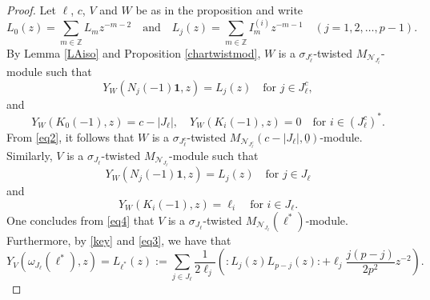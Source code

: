 \documentclass[12pt, reqno]{amsart}
\numberwithin{equation}{section}
\numberwithin{equation}{section}
\def\({\left(}
\def\){\right)}
\newcommand{\Z}{\mathbb{Z}}
\newcommand{\CN}{\mathcal{N}}
\newcommand{\un}[1]{\underline{#1}}
\begin{document}
\begin{proof}
 Let $\bm{\ell}$, $c$, $V$ and $W$ be as in the proposition and write
 \[
  L_0(z)=\sum_{m\in \Z} L_m z^{-m-2}\quad\text{and}\quad
  L_j(z)=\sum_{m\in \Z} I_m^{(i)}z^{-m-1}\quad (j=1,2,\dots,p-1).
 \]
 By Lemma \ref{LAiso} and Proposition \ref{chartwistmod},
 $W$ is a $\sigma_{J_{\bm{\ell}}^c}$-twisted $M_{\CN_{J_{\bm{\ell}}^c}}$-module such that
 \begin{equation} \label{eq1}
  Y_W(N_j(-1){\bm 1},z)=L_j(z)\quad\text{for } j\in J_{\bm\ell}^c,
 \end{equation}
 and
 \begin{equation} \label{eq2}
   Y_W(K_0(-1),z)=c-|J_{\bm \ell}|,\quad Y_W(K_i(-1),z)=0\quad\text{for }i\in (J_{\bm\ell}^c)^*.
 \end{equation}
 From \eqref{eq2}, it follows that $W$ is  a $\sigma_{J_{\bm{\ell}}^c}$-twisted $M_{\CN_{J_{\bm{\ell}}^c}}(c-|J_{\bm \ell}|,{\un 0})$-module.
 Similarly,  $V$ is a $\sigma_{J_{\bm{\ell}}}$-twisted $M_{\CN_{J_{\bm{\ell}}}}$-module such that
 \begin{equation} \label{eq3}
  Y_W(N_j(-1){\bm 1},z)=L_j(z) \quad\text{for }j\in J_{\bm\ell}
 \end{equation}
 and
 \begin{equation}\label{eq4}
  Y_W(K_i(-1),z)=\ell_i\quad\text{for }i\in J_{\bm\ell}.
 \end{equation}
 One concludes from \eqref{eq4} that $V$ is a $\sigma_{J_{\bm{\ell}}}$-twisted
 $M_{\CN_{J_{\bm{\ell}}}}({\bm \ell}^*)$-module.
 Furthermore, by \eqref{key} and \eqref{eq3}, we have that
 \begin{equation} \label{eq5}
  Y_V(\omega_{J_{\bm\ell}}({\bm\ell}^*),z)= L_{\bm\ell^*}(z)
  :=\sum_{j\in J_{\bm\ell}}\frac{1}{2\ell_j}\(:L_j(z) L_{p-j}(z):
  +\ell_j\frac{j(p-j)}{2p^2}z^{-2}\).
 \end{equation}



\end{proof}
\end{document}
